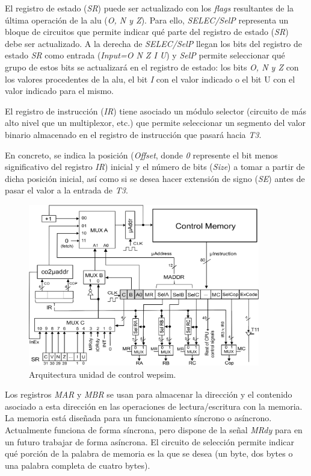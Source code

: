 El registro de estado (\emph{SR}) puede ser actualizado con los \emph{flags} resultantes de la última operación de la \acrshort{alu} (\emph{O, N y Z}). Para ello, \emph{SELEC/SelP} representa un bloque de circuitos que permite indicar qué parte del registro de estado (\emph{SR}) debe ser actualizado. A la derecha de \emph{SELEC/SelP} llegan los bits del registro de estado \emph{SR} como entrada (\emph{Input=O N Z I U}) y \emph{SelP} permite seleccionar qué grupo de estos bits se actualizará en el registro de estado: los bits \emph{O, N y Z} con los valores procedentes de la \acrshort{alu}, el bit \emph{I} con el valor indicado o el bit U con el valor indicado para el mismo.

El registro de instrucción (\emph{IR}) tiene asociado un módulo selector (circuito de  más alto nivel que un multiplexor, etc.) que permite seleccionar un segmento del valor binario almacenado en el registro de instrucción que pasará hacia \emph{T3}.

En concreto, se indica la posición (\emph{Offset}, donde \emph{0} represente el bit menos significativo del registro \emph{IR}) inicial y el número de bits (\emph{Size}) a tomar a partir de dicha posición inicial, así como si se desea hacer extensión de signo (\emph{SE}) antes de pasar el valor a la entrada de \emph{T3}.

\begin{figure}[htbp]
 	\centering
 	\includegraphics[width=0.9\textwidth]{figures/controlunit6}
 	\caption{Arquitectura unidad de control \acrshort{wepsim}.}
	\label{fig:wepsimCU_figure}
\end{figure}

Los registros \emph{MAR} y \emph{MBR} se usan para almacenar la dirección y el contenido asociado a esta dirección en las operaciones de lectura/escritura con la memoria. La memoria está diseñada para un funcionamiento síncrono o asíncrono. Actualmente funciona de forma síncrona, pero dispone de la señal \emph{MRdy} para en un futuro trabajar de forma asíncrona. El circuito de selección permite indicar qué porción de la palabra de memoria es la que se desea (un byte, dos bytes o una palabra completa de cuatro bytes).

